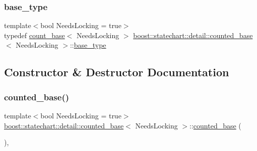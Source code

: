 \subsubsection{\texorpdfstring{base\+\_\+type}{base\_type}}
{\footnotesize\ttfamily template$<$bool Needs\+Locking = true$>$ \\
typedef \mbox{\hyperlink{structboost_1_1statechart_1_1detail_1_1count__base}{count\+\_\+base}}$<$ Needs\+Locking $>$ \mbox{\hyperlink{classboost_1_1statechart_1_1detail_1_1counted__base}{boost\+::statechart\+::detail\+::counted\+\_\+base}}$<$ Needs\+Locking $>$\+::\mbox{\hyperlink{classboost_1_1statechart_1_1detail_1_1counted__base_acbd7bf2800a572f79c494f2efb9e98aa}{base\+\_\+type}}\hspace{0.3cm}{\ttfamily [private]}}



\subsection{Constructor \& Destructor Documentation}
\mbox{\label{classboost_1_1statechart_1_1detail_1_1counted__base_a47bad235fc3b18a57eefafa1e685c4e2}} 
\subsubsection{\texorpdfstring{counted\+\_\+base()}{counted\_base()}\hspace{0.1cm}{\footnotesize\ttfamily [1/2]}}
{\footnotesize\ttfamily template$<$bool Needs\+Locking = true$>$ \\
\mbox{\hyperlink{classboost_1_1statechart_1_1detail_1_1counted__base}{boost\+::statechart\+::detail\+::counted\+\_\+base}}$<$ Needs\+Locking $>$\+::\mbox{\hyperlink{classboost_1_1statechart_1_1detail_1_1counted__base}{counted\+\_\+base}} (\begin{DoxyParamCaption}{ }\end{DoxyParamCaption})\hspace{0.3cm}{\ttfamily [inline]}, {\ttfamily [protected]}}

\mbox{\label{classboost_1_1statechart_1_1detail_1_1counted__base_acdca8c95fbbfbaa0c514f1a59f1236cd}} 
